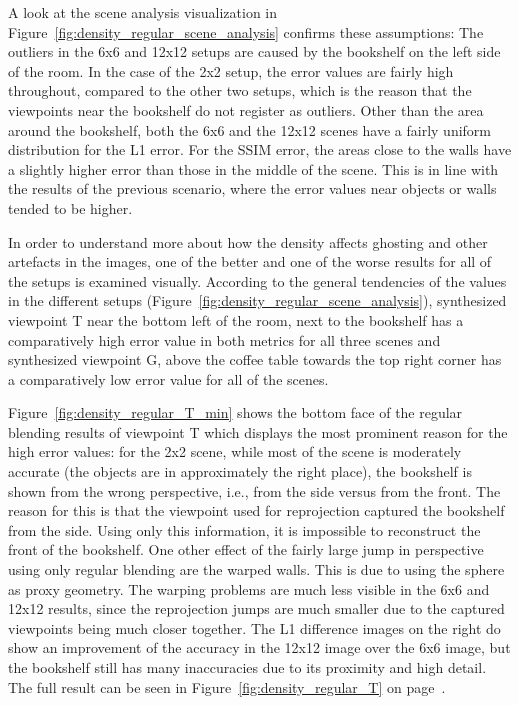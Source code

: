 A look at the scene analysis visualization in Figure~\ref{fig:density_regular_scene_analysis} confirms these assumptions: The outliers in the 6x6 and 12x12 setups are caused by the bookshelf on the left side of the room. In the case of the 2x2 setup, the error values are fairly high throughout, compared to the other two setups, which is the reason that the viewpoints near the bookshelf do not register as outliers. Other than the area around the bookshelf, both the 6x6 and the 12x12 scenes have a fairly uniform distribution for the L1 error. For the SSIM error, the areas close to the walls have a slightly higher error than those in the middle of the scene. This is in line with the results of the previous scenario, where the error values near objects or walls tended to be higher.

In order to understand more about how the density affects ghosting and other artefacts in the images, one of the better and one of the worse results for all of the setups is examined visually. According to the general tendencies of the values in the different setups (Figure~\ref{fig:density_regular_scene_analysis}), synthesized viewpoint T near the bottom left of the room, next to the bookshelf has a comparatively high error value in both metrics for all three scenes and synthesized viewpoint G, above the coffee table towards the top right corner has a comparatively low error value for all of the scenes.

Figure~\ref{fig:density_regular_T_min} shows the bottom face of the regular blending results of viewpoint T which displays the most prominent reason for the high error values: for the 2x2 scene, while most of the scene is moderately accurate (the objects are in approximately the right place), the bookshelf is shown from the wrong perspective, i.e., from the side versus from the front. The reason for this is that the viewpoint used for reprojection captured the bookshelf from the side. Using only this information, it is impossible to reconstruct the front of the bookshelf. One other effect of the fairly large jump in perspective using only regular blending are the warped walls. This is due to using the sphere as proxy geometry. The warping problems are much less visible in the 6x6 and 12x12 results, since the reprojection jumps are much smaller due to the captured viewpoints being much closer together. The L1 difference images on the right do show an improvement of the accuracy in the 12x12 image over the 6x6 image, but the bookshelf still has many inaccuracies due to its proximity and high detail. The full result can be seen in Figure~\ref{fig:density_regular_T} on page~\pageref{fig:density_regular_T}.

